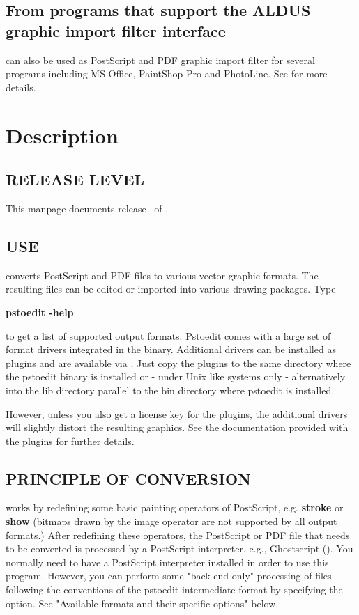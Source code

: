 \documentclass[english,a4paper]{article}
\begin{document}
\subsection{From programs that support the ALDUS graphic import filter interface}

 can also be used as PostScript and PDF graphic import filter for several programs including
MS Office, PaintShop-Pro and PhotoLine. See
 for more
details.


\section{Description}

\subsection{RELEASE LEVEL}

This manpage documents release \Version\ of .

\subsection{USE}

 converts PostScript and PDF files to various vector graphic
formats. The resulting files can be edited or imported into various drawing
packages. Type

     \textbf{pstoedit -help}

\noindent to get a list of supported output formats. Pstoedit comes with a
large set of format drivers integrated in the binary. Additional drivers can be
installed as plugins and are available via
.
Just copy the plugins to the same directory where the pstoedit binary is installed or - under Unix like systems only - alternatively into the lib directory parallel to the bin directory where pstoedit is installed.

However, unless you also get a license key for the plugins, the additional
drivers will slightly distort the resulting graphics. See the documentation
provided with the plugins for further details.

\subsection{PRINCIPLE OF CONVERSION}

 works by redefining some basic painting operators of
PostScript, e.g. \textbf{stroke} or \textbf{show} (bitmaps drawn by the image
operator are not supported by all output formats.) After
redefining these operators, the PostScript or PDF file that needs to be
converted is processed by a PostScript interpreter, e.g., Ghostscript
(). You normally need to have a PostScript interpreter installed in
order to use this program. However, you can perform some "back end only" processing
of files following the conventions of the pstoedit intermediate format by specifying the  option. See "Available formats and their specific options" below.
\end{document}
